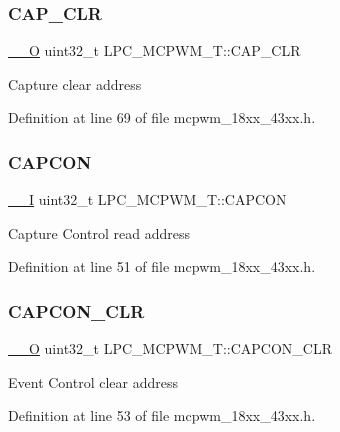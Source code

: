 \subsubsection{\texorpdfstring{C\+A\+P\+\_\+\+C\+LR}{CAP\_CLR}}
{\footnotesize\ttfamily \hyperlink{core__sc300_8h_a7e25d9380f9ef903923964322e71f2f6}{\+\_\+\+\_\+O} uint32\+\_\+t L\+P\+C\+\_\+\+M\+C\+P\+W\+M\+\_\+\+T\+::\+C\+A\+P\+\_\+\+C\+LR}

Capture clear address 

Definition at line 69 of file mcpwm\+\_\+18xx\+\_\+43xx.\+h.

\mbox{\label{struct_l_p_c___m_c_p_w_m___t_a47afe6c393cc7da61af1d48bfc0f709c}} 
\subsubsection{\texorpdfstring{C\+A\+P\+C\+ON}{CAPCON}}
{\footnotesize\ttfamily \hyperlink{core__sc300_8h_af63697ed9952cc71e1225efe205f6cd3}{\+\_\+\+\_\+I} uint32\+\_\+t L\+P\+C\+\_\+\+M\+C\+P\+W\+M\+\_\+\+T\+::\+C\+A\+P\+C\+ON}

Capture Control read address 

Definition at line 51 of file mcpwm\+\_\+18xx\+\_\+43xx.\+h.

\mbox{\label{struct_l_p_c___m_c_p_w_m___t_aadd69d706d636d53ff8893d3a0be210a}} 
\subsubsection{\texorpdfstring{C\+A\+P\+C\+O\+N\+\_\+\+C\+LR}{CAPCON\_CLR}}
{\footnotesize\ttfamily \hyperlink{core__sc300_8h_a7e25d9380f9ef903923964322e71f2f6}{\+\_\+\+\_\+O} uint32\+\_\+t L\+P\+C\+\_\+\+M\+C\+P\+W\+M\+\_\+\+T\+::\+C\+A\+P\+C\+O\+N\+\_\+\+C\+LR}

Event Control clear address 

Definition at line 53 of file mcpwm\+\_\+18xx\+\_\+43xx.\+h.

